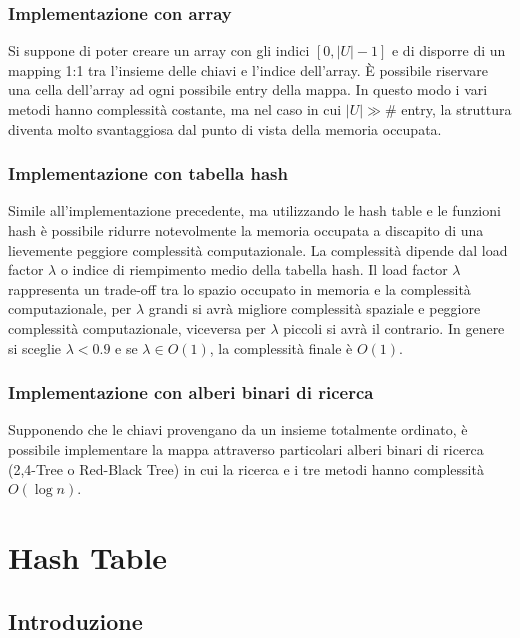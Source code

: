 \documentclass[a4paper]{article}
\begin{document}
\subsubsection*{Implementazione con array}
Si suppone di poter creare un array con gli indici \([0, |U|-1]\) e di disporre di un mapping 1:1 tra l'insieme delle chiavi
e l'indice dell'array. È possibile riservare una cella dell'array ad ogni possibile entry della mappa. In questo modo i vari
metodi hanno complessità costante, ma nel caso in cui \(|U| \gg \#\) entry, la struttura diventa molto svantaggiosa dal punto
di vista della memoria occupata.

\subsubsection*{Implementazione con tabella hash}
Simile all'implementazione precedente, ma utilizzando le hash table e le funzioni hash è possibile ridurre notevolmente la memoria
occupata a discapito di una lievemente peggiore complessità computazionale. La complessità dipende dal load factor \(\lambda\)
o indice di riempimento medio della tabella hash. Il load factor \(\lambda\) rappresenta un trade-off tra lo spazio occupato in
memoria e la complessità computazionale, per \(\lambda\) grandi si avrà migliore complessità spaziale e peggiore complessità
computazionale, viceversa per \(\lambda\) piccoli si avrà il contrario. In genere si sceglie \(\lambda < 0.9\) e se
\(\lambda \in O(1)\), la complessità finale è \(O(1)\). 

\subsubsection*{Implementazione con alberi binari di ricerca}
Supponendo che le chiavi provengano da un insieme totalmente ordinato, è possibile implementare la mappa attraverso particolari
alberi binari di ricerca (2,4-Tree o Red-Black Tree) in cui la ricerca e i tre metodi hanno complessità \(O(\log n)\).

\newpage

\section{Hash Table}
\subsection{Introduzione}
\end{document}
